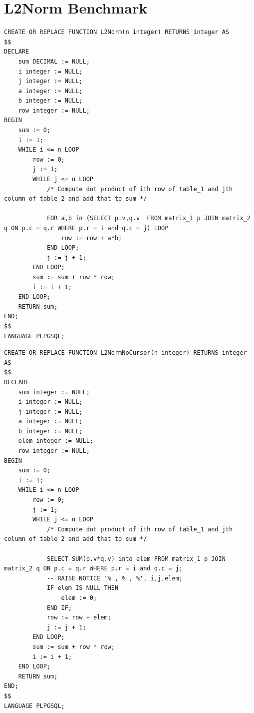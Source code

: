 \documentclass[12pt]{cmuthesis}
\begin{document}
\section{L2Norm Benchmark}
\begin{listing}
    \begin{verbatim}
CREATE OR REPLACE FUNCTION L2Norm(n integer) RETURNS integer AS 
$$
DECLARE 
	sum DECIMAL := NULL;
	i integer := NULL;
	j integer := NULL;
	a integer := NULL;
	b integer := NULL;
	row integer := NULL;
BEGIN
	sum := 0;
	i := 1;
	WHILE i <= n LOOP
		row := 0;
		j := 1;
        WHILE j <= n LOOP
            /* Compute dot product of ith row of table_1 and jth column of table_2 and add that to sum */
            
            FOR a,b in (SELECT p.v,q.v  FROM matrix_1 p JOIN matrix_2 q ON p.c = q.r WHERE p.r = i and q.c = j) LOOP
				row := row + a*b;
			END LOOP;
			j := j + 1;
		END LOOP;
		sum := sum + row * row;
		i := i + 1;
	END LOOP;
	RETURN sum;
END;
$$
LANGUAGE PLPGSQL;
    \end{verbatim}
    \caption{L2Norm Function}
    \label{lst:l2norm}
\end{listing}

\begin{listing}
    \begin{verbatim}
CREATE OR REPLACE FUNCTION L2NormNoCursor(n integer) RETURNS integer AS 
$$
DECLARE 
    sum integer := NULL;
    i integer := NULL;
    j integer := NULL;
    a integer := NULL;
    b integer := NULL;
    elem integer := NULL;
    row integer := NULL;
BEGIN
    sum := 0;
    i := 1;
    WHILE i <= n LOOP
        row := 0;
        j := 1;
        WHILE j <= n LOOP
            /* Compute dot product of ith row of table_1 and jth column of table_2 and add that to sum */

            SELECT SUM(p.v*q.v) into elem FROM matrix_1 p JOIN matrix_2 q ON p.c = q.r WHERE p.r = i and q.c = j;
            -- RAISE NOTICE '% , % , %', i,j,elem;
            IF elem IS NULL THEN
                elem := 0;
            END IF;
            row := row + elem;
            j := j + 1;
        END LOOP;
        sum := sum + row * row;
        i := i + 1;
    END LOOP;
    RETURN sum;
END;
$$
LANGUAGE PLPGSQL;
    \end{verbatim}
    \caption{L2Norm Function from \cref{lst:l2norm} with the cursor loop removed}
    \label{fig:l2normnocursor}
\end{listing}
\end{document}
